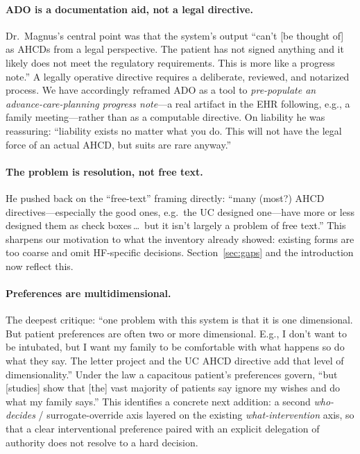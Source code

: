 \documentclass[11pt]{article}
\begin{document}
\paragraph{ADO is a documentation aid, not a legal directive.}
Dr.\ Magnus's central point was that the system's output ``can't [be thought of] as AHCDs from a legal perspective. The patient has not signed anything and it likely does not meet the regulatory requirements. This is more like a progress note.'' A legally operative directive requires a deliberate, reviewed, and notarized process. We have accordingly reframed ADO as a tool to \emph{pre-populate an advance-care-planning progress note}---a real artifact in the EHR following, e.g., a family meeting---rather than as a computable directive. On liability he was reassuring: ``liability exists no matter what you do. This will not have the legal force of an actual AHCD, but suits are rare anyway.''

\paragraph{The problem is resolution, not free text.}
He pushed back on the ``free-text'' framing directly: ``many (most?) AHCD directives---especially the good ones, e.g.\ the UC designed one---have more or less designed them as check boxes\,\dots\ but it isn't largely a problem of free text.'' This sharpens our motivation to what the inventory already showed: existing forms are too coarse and omit HF-specific decisions. Section~\ref{sec:gaps} and the introduction now reflect this.

\paragraph{Preferences are multidimensional.}
The deepest critique: ``one problem with this system is that it is one dimensional. But patient preferences are often two or more dimensional. E.g., I don't want to be intubated, but I want my family to be comfortable with what happens so do what they say. The letter project and the UC AHCD directive add that level of dimensionality.'' Under the law a capacitous patient's preferences govern, ``but [studies] show that [the] vast majority of patients say ignore my wishes and do what my family says.'' This identifies a concrete next addition: a second \emph{who-decides} / surrogate-override axis layered on the existing \emph{what-intervention} axis, so that a clear interventional preference paired with an explicit delegation of authority does not resolve to a hard decision.
\end{document}
